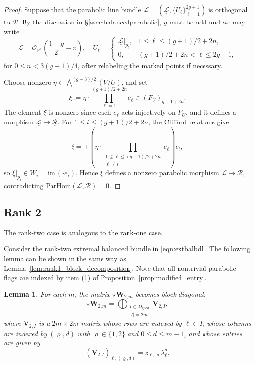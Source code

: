 \documentclass[12pt, letterpaper]{amsart}
\newtheorem{lemma}[theorem]{Lemma}
\theoremstyle{definition}
\newcommand{\PP}{\mathbb{P} }
\newcommand{\cL}{\mathcal{L} }
\newcommand{\cO}{\mathcal{O} }
\newcommand{\cR}{\mathcal{R} }
\newcommand{\bV}{\mathbf{V} }
\newcommand{\bW}{\mathbf{W} }
\newcommand{\Om}{\Omega}
\newcommand{\lbd}{\lambda}
\newcommand{\pHom}{\mathrm{ParHom}}
\def\im{\mathrm{im}\, }
\begin{document}
\begin{proof}
Suppose that the parabolic line bundle \(\cL=(\underline{\cL},\{U_\ell\}_{\ell=1}^{2g+1})\) is orthogonal to \(\cR\). By the discussion in \S\ref{ssec:balancedparabolic}, \(g\) must be odd and we may write
\[
\underline{\cL}=\cO_{\PP^1}\left(\frac{1-g}{2}-n\right),\quad U_\ell= \begin{cases} \underline{\cL}|_{p_\ell}, & 1\le\ell\le (g+1)/2+2n,\\[4pt] 0, & (g+1)/2+2n<\ell\le 2g+1, \end{cases}
\]
for \(0\le n<3(g+1)/4\), after relabeling the marked points if necessary.

Choose nonzero \(\eta\in\bigwedge^{(g-3)/2}(V/U)\), and set
\[\xi:=\eta\cdot\prod_{\ell=1}^{(g+1)/2+2n}e_\ell\in(F_U)_{g-1+2n}.\]
The element \(\xi\) is nonzero since each \(e_\ell\) acts injectively on \(F_U\), and it defines a morphism \(\underline{\cL}\to\underline{\cR}\). For \(1\le i\le(g+1)/2+2n\), the Clifford relations give
\[\xi=\pm\left(\eta\cdot\prod_{\substack{1\le\ell\le(g+1)/2+2n\\\ell\ne i}}e_\ell\right)e_i,\]
so \(\xi|_{p_i}\in W_i=\im(\cdot e_i)\). Hence \(\xi\) defines a nonzero parabolic morphism \(\cL\to\cR\), contradicting \(\pHom(\cL,\cR)=0\).
\end{proof}

\subsection{Rank 2}\label{ssec:rank2}

The rank-two case is analogous to the rank-one case.

Consider the rank-two extremal balanced bundle in \eqref{eqn:extbalbdl}. The following lemma can be shown in the same way as Lemma~\ref{lem:rank1_block_decomposition}. Note that all nontrivial parabolic flags are indexed by item (1) of Proposition~\ref{prop:modified_entry}.

\begin{lemma}\label{lem:rank2_block_decomposition}
For each \(m\), the matrix \(\star\bW_{2,m}\) becomes block diagonal:
\[\star\bW_{2,m}=\bigoplus_{\substack{I\subset\Om_{\mathrm{good}}\\|I|=2m}}\bV_{2,I},\]
where \(\bV_{2,I}\) is a \(2m\times 2m\) matrix whose rows are indexed by \(\ell\in I\), whose columns are indexed by \((\varrho,d)\) with \(\varrho\in\{1,2\}\) and \(0\le d\le m-1\), and whose entries are given by
\[(\bV_{2,I})_{\ell,(\varrho,d)}=z_{\ell,\varrho}\lbd_\ell^d.\]
\end{lemma}
\end{document}
